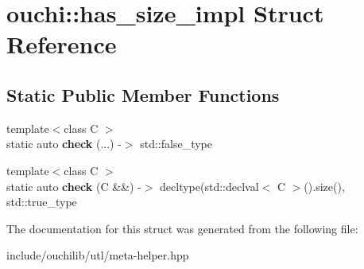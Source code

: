 \hypertarget{structouchi_1_1has__size__impl}{}\section{ouchi\+::has\+\_\+size\+\_\+impl Struct Reference}
\label{structouchi_1_1has__size__impl}
\subsection*{Static Public Member Functions}
\begin{DoxyCompactItemize}
\item 
\mbox{\label{structouchi_1_1has__size__impl_ad363aaaa23f2b6201a55d57f76d4eb39}} 
{\footnotesize template$<$class C $>$ }\\static auto {\bfseries check} (...) -\/$>$ std\+::false\+\_\+type
\item 
\mbox{\label{structouchi_1_1has__size__impl_a6d1d704e5499d2ddea3fadf2f5b43fd1}} 
{\footnotesize template$<$class C $>$ }\\static auto {\bfseries check} (C \&\&) -\/$>$ decltype(std\+::declval$<$ C $>$().size(), std\+::true\+\_\+type
\end{DoxyCompactItemize}


The documentation for this struct was generated from the following file\+:\begin{DoxyCompactItemize}
\item 
include/ouchilib/utl/meta-\/helper.\+hpp\end{DoxyCompactItemize}
